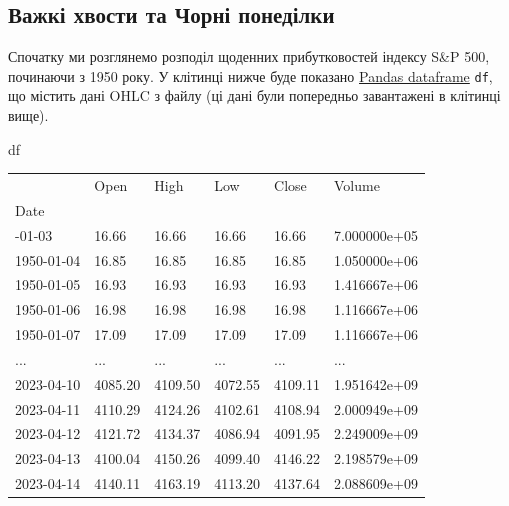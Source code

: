 \documentclass[
  letterpaper,
]{report}
\newenvironment{Shaded}{\begin{snugshade}}{\end{snugshade}}
\newcommand{\NormalTok}[1]{\textcolor[rgb]{0.00,0.23,0.31}{#1}}
\begin{document}
\hypertarget{ux432ux430ux436ux43aux456-ux445ux432ux43eux441ux442ux438-ux442ux430-ux447ux43eux440ux43dux456-ux43fux43eux43dux435ux434ux456ux43bux43aux438}{%
\subsection{Важкі хвости та Чорні
понеділки}\label{ux432ux430ux436ux43aux456-ux445ux432ux43eux441ux442ux438-ux442ux430-ux447ux43eux440ux43dux456-ux43fux43eux43dux435ux434ux456ux43bux43aux438}}

Спочатку ми розглянемо розподіл щоденних прибутковостей індексу S\&P
500, починаючи з 1950 року. У клітинці нижче буде показано
\href{https://pandas.pydata.org/docs/user_guide/10min.html}{Pandas
dataframe} \texttt{df}, що містить дані OHLC з файлу (ці дані були
попередньо завантажені в клітинці вище).

\begin{Shaded}
\begin{Highlighting}[]
\NormalTok{df}
\end{Highlighting}
\end{Shaded}

\begin{longtable}[]{@{}llllll@{}}
\toprule\noalign{}
& Open & High & Low & Close & Volume \\
Date & & & & & \\
\midrule\noalign{}
\endhead
\bottomrule\noalign{}
\endlastfoot
1950-01-03 & 16.66 & 16.66 & 16.66 & 16.66 & 7.000000e+05 \\
1950-01-04 & 16.85 & 16.85 & 16.85 & 16.85 & 1.050000e+06 \\
1950-01-05 & 16.93 & 16.93 & 16.93 & 16.93 & 1.416667e+06 \\
1950-01-06 & 16.98 & 16.98 & 16.98 & 16.98 & 1.116667e+06 \\
1950-01-07 & 17.09 & 17.09 & 17.09 & 17.09 & 1.116667e+06 \\
... & ... & ... & ... & ... & ... \\
2023-04-10 & 4085.20 & 4109.50 & 4072.55 & 4109.11 & 1.951642e+09 \\
2023-04-11 & 4110.29 & 4124.26 & 4102.61 & 4108.94 & 2.000949e+09 \\
2023-04-12 & 4121.72 & 4134.37 & 4086.94 & 4091.95 & 2.249009e+09 \\
2023-04-13 & 4100.04 & 4150.26 & 4099.40 & 4146.22 & 2.198579e+09 \\
2023-04-14 & 4140.11 & 4163.19 & 4113.20 & 4137.64 & 2.088609e+09 \\
\end{longtable}
\end{document}
